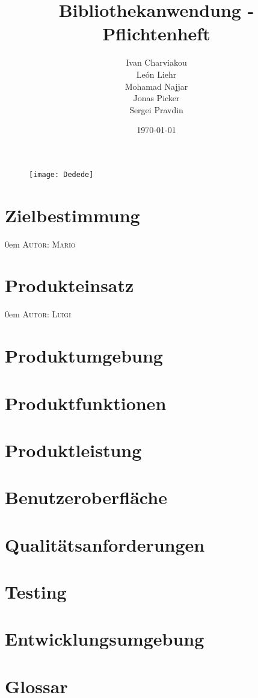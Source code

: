 \documentclass{article}
\title{Bibliothekanwendung - Pflichtenheft}
\date{\today}
\author{
	Ivan Charviakou\\
	León Liehr\\
	Mohamad Najjar\\
	Jonas Picker\\
	Sergei Pravdin
}
\makeatletter
\newcommand{\sectionauthor}[1]{
	{\parindent 0em \large \scshape Autor: #1 \par \nobreak \vspace*{2em}}
	\@afterheading
}
\makeatother
\begin{document}
\maketitle
\begin{figure}[h]
	\centering
	\texttt{[image: Dedede]}
\end{figure}
\newpage

\section{Zielbestimmung}
\sectionauthor{Mario}

\newpage

\section{Produkteinsatz}
\sectionauthor{Luigi}

\newpage

\section{Produktumgebung}

\newpage

\section{Produktfunktionen}

\newpage

\section{Produktleistung}

\newpage

\section{Benutzeroberfläche}

\newpage

\section{Qualitätsanforderungen}

\newpage

\section{Testing}

\newpage

\section{Entwicklungsumgebung}

\newpage

\section{Glossar}
\end{document}
